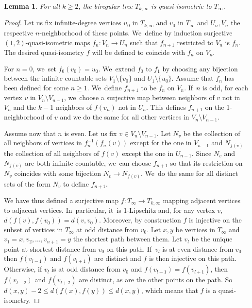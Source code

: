 \documentclass[JEP,XML,SOM,Unicode,NoFloatCountersInSection,published]{cedram}
\theoremstyle{plain}
\newtheorem{lemma}[theorem]{Lemma}
\theoremstyle{definition}
\theoremstyle{remark}
\begin{document}
\begin{lemma}
For all $k\geq2$, the biregular tree $T_{k,\infty}$ is quasi-isometric to $T_\infty$.
\end{lemma}

\begin{proof}
Let us fix infinite-degree vertices $u_0$ in $T_{k,\infty}$ and $v_0$ in $T_\infty$ and $U_n, V_n$ the respective $n$-neighborhood of these points. We~define by induction surjective $(1,2)$-quasi-isometric maps $f_n\colon V_n\to U_n$ such that $f_{n+1}$ restricted to $V_n$ is $f_n$. The desired quasi-isometry $f$ will be defined to coincide with $f_n$ on $V_n$.

For $n=0$, we~set $f_0(v_0)=u_0$. We~extend $f_0$ to $f_1$ by choosing any bijection between the infinite countable sets $V_{1}\setminus\{v_0\}$ and $U_1\setminus\{u_0\}$.
Assume that $f_n$ has been defined for some $n\geq1$. We~define $f_{n+1}$ to be $f_n$ on $V_n$. If~$n$ is odd, for each vertex $v$ in $V_{n}\setminus V_{n-1}$, we~choose a surjective map between neighbors of $v$ not in $V_n$ and the $k-1$ neighbors of $f(v_n)$ not in $U_n$.
This defines $f_{n+1}$ on the 1-neighborhood of $v$ and we do the same for all other vertices in $V_n\setminus V_{n-1}$.

Assume now that $n$ is even.
Let us fix $v\in V_n\setminus V_{n-1}$.
Let $N_v$ be the collection of all neighbors of vertices in $f_n^{-1}(f_n(v))$ except for the one in $V_{n-1}$ and $N_{f(v)}$ the collection of all neighbors of $f(v)$ except the one in $U_{n-1}$.
Since $N_v$ and $N_{f(v)}$ are both infinite countable, we~can choose $f_{n+1}$ so that its restriction on $N_v$ coincides with some bijection $N_v \to N_{f(v)}$. We~do the same for all distinct sets of the form $N_v$ to define $f_{n+1}$.

We have thus defined a surjective map $f\colon T_\infty\to T_{k,\infty}$ mapping adjacent vertices to adjacent vertices. In~particular, it~is 1-Lipschitz and, for any vertex $v$, $d(f(v),f(v_0))=d(v,v_0)$.
Moreover, by construction $f$ is injective on the subset of vertices in $T_\infty$ at odd distance from $v_0$.
Let $x,y$ be vertices in $T_\infty$ and $v_1=x,v_2,\dots,v_{n+1}=y$ the shortest path between them.
Let $v_l$ be the unique point at shortest distance from $v_0$ on this path. If~$v_l$ is at even distance from $v_0$ then $f(v_{l-1})$ and $f(v_{l+1})$ are distinct and $f$ is then injective on this path.
Otherwise, if $v_l$ is at odd distance from $v_0$ and $f(v_{l-1})=f(v_{l+1})$, then $f(v_{l-2})$ and $f(v_{l+2})$ are distinct, as are the other points on the path.
So $d(x,y)-2\leq d(f(x),f(y))\leq d(x,y)$, which means that $f$ is a quasi-isometry.
\end{proof}
\end{document}
